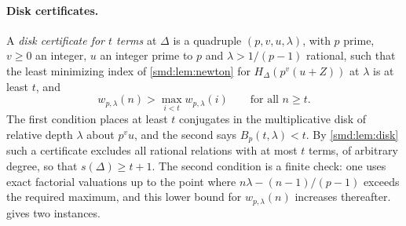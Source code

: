 \paragraph{Disk certificates.}
A \emph{disk certificate for $t$ terms} at $\Delta$ is a quadruple $(p,v,u,\lambda)$,
with $p$ prime, $v\ge0$ an integer, $u$ an integer prime to $p$ and
$\lambda>1/(p-1)$ rational, such that the least minimizing index of
\cref{smd:lem:newton} for $H_\Delta(p^v(u+Z))$ at $\lambda$ is at least $t$, and
\[
 w_{p,\lambda}(n)>\max_{i<t}w_{p,\lambda}(i)\qquad\text{for all }n\ge t .
\]
The first condition places at least $t$ conjugates in the multiplicative disk of relative
depth $\lambda$ about $p^vu$, and the second says $B_p(t,\lambda)<t$. By
\cref{smd:lem:disk} such a certificate excludes all rational relations with at most $t$
terms, of arbitrary degree, so that $s(\Delta)\ge t+1$. The second condition is a finite
check: one uses exact factorial valuations up to the point where
$n\lambda-(n-1)/(p-1)$ exceeds the required maximum, and this lower bound for
$w_{p,\lambda}(n)$ increases thereafter.  gives two instances.


